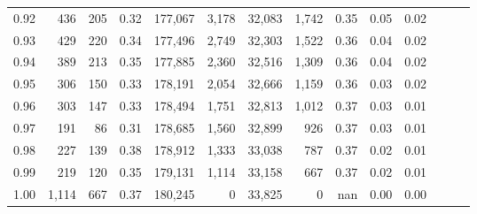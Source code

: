 \begin{tabular}{rrrrrrrrrrrrrr}
0.92 &    436 &  205 &  0.32 &  177,067 &    3,178 &  32,083 &   1,742 &  0.35 &  0.05 &      0.02 \\
0.93 &    429 &  220 &  0.34 &  177,496 &    2,749 &  32,303 &   1,522 &  0.36 &  0.04 &      0.02 \\
0.94 &    389 &  213 &  0.35 &  177,885 &    2,360 &  32,516 &   1,309 &  0.36 &  0.04 &      0.02 \\
0.95 &    306 &  150 &  0.33 &  178,191 &    2,054 &  32,666 &   1,159 &  0.36 &  0.03 &      0.02 \\
0.96 &    303 &  147 &  0.33 &  178,494 &    1,751 &  32,813 &   1,012 &  0.37 &  0.03 &      0.01 \\
0.97 &    191 &   86 &  0.31 &  178,685 &    1,560 &  32,899 &     926 &  0.37 &  0.03 &      0.01 \\
0.98 &    227 &  139 &  0.38 &  178,912 &    1,333 &  33,038 &     787 &  0.37 &  0.02 &      0.01 \\
0.99 &    219 &  120 &  0.35 &  179,131 &    1,114 &  33,158 &     667 &  0.37 &  0.02 &      0.01 \\
1.00 &  1,114 &  667 &  0.37 &  180,245 &        0 &  33,825 &       0 &   nan &  0.00 &      0.00 \\
\bottomrule
\end{tabular}
